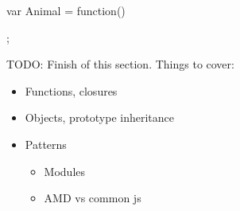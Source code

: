 \begin{code}
var Animal = function(){
  
};
\end{code}	


TODO: Finish of this section. Things to cover:

\begin{itemize}
	\item Functions, closures
	\item Objects, prototype inheritance
	\item Patterns
	\begin{itemize}
		\item Modules
		\item AMD vs common js
	\end{itemize}
\end{itemize}

